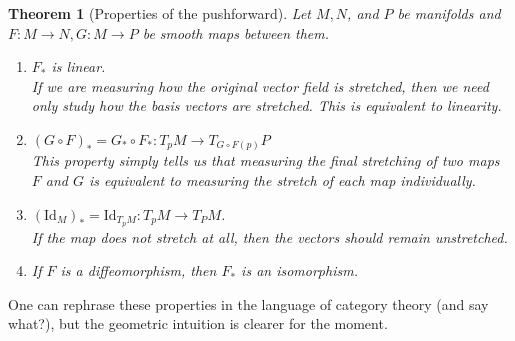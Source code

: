 \documentclass[12pt,letterpaper,boxed]{article}
\newtheorem{theorem}{Theorem}[section]
\begin{document}
\begin{theorem}[Properties of the pushforward]
	Let $M, N$, and $P$ be manifolds and $F : M \to N, G : M \to P$ be smooth maps between them.
	\begin{enumerate}
		\item $F_*$ is linear.
			\\
			If we are measuring how the original vector field is stretched, then we need only study how the basis vectors are stretched. This is equivalent to linearity.
		\item $ (G \circ F)_* = G_* \circ F_* : T_p M \to T_{G \circ F(p)} P$
			\\
			This property simply tells us that measuring the final stretching of two maps $F$ and $G$ is equivalent to measuring the stretch of each map individually.
		\item $ (\textrm{Id}_M)_* = \textrm{Id}_{T_p M} : T_p M \to T_P M$.
			\\
			If the map does not stretch at all, then the vectors should remain unstretched.
		\item If $F$ is a diffeomorphism, then $F_*$ is an isomorphism.
	\end{enumerate}
\end{theorem}

One can rephrase these properties in the language of category theory (and say what?), but the geometric intuition is clearer for the moment.
\end{document}
